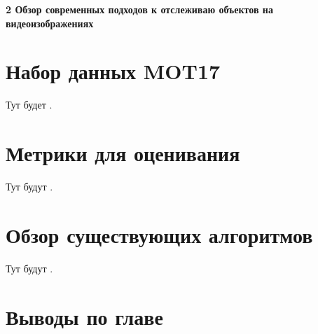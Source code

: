 \newpage
\begin{flushleft}
  \textbf{\large 2 Обзор современных подходов к отслеживаю объектов на видеоизображениях}
\end{flushleft}




\section{Набор данных MOT17}
Тут будет \cite{dendorfer2021motchallenge}.
\section{Метрики для оценивания}
Тут будут \cite{luiten2021hota, bernardin2008evaluating, ristani2016performance}.
\section{Обзор существующих алгоритмов }
Тут будут \cite{aharon2022bot, cao2023observation, du2023strongsort, maggiolino2023deep, stadler2023improved, zhang2022bytetrack}.

\section{Выводы по главе}
